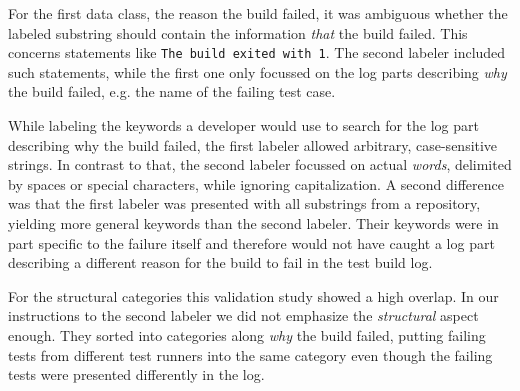\documentclass[\myrootdir/main.tex]{subfiles}
\begin{document}
For the first data class, the reason the build failed, it was ambiguous whether the labeled substring should contain the information \emph{that} the build failed.
This concerns statements like \texttt{The build exited with 1}.
The second labeler included such statements, while the first one only focussed on the log parts describing \emph{why} the build failed, e.g. the name of the failing test case.

While labeling the keywords a developer would use to search for the log part describing why the build failed, the first labeler allowed arbitrary, case-sensitive strings.
In contrast to that, the second labeler focussed on actual \emph{words}, delimited by spaces or special characters, while ignoring capitalization.
A second difference was that the first labeler was presented with all substrings from a repository, yielding more general keywords than the second labeler.
Their keywords were in part specific to the failure itself and therefore would not have caught a log part describing a different reason for the build to fail in the test build log.

For the structural categories this validation study showed a high overlap.
In our instructions to the second labeler we did not emphasize the \emph{structural} aspect enough.
They sorted into categories along \emph{why} the build failed, putting failing tests from different test runners into the same category even though the failing tests were presented differently in the log.

\end{document}
